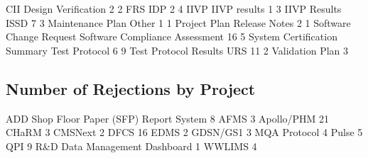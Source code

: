 \documentclass{article}
\begin{document}
\begin{Schunk}
\begin{Soutput}
                           CII            Design Verification 
                             2                              2 
                           FRS                            IDP 
                             2                              4 
                          IIVP                   IIVP results 
                             1                              3 
                  IIVP Results                           ISSD 
                             7                              3 
              Maintenance Plan                          Other 
                             1                              1 
                  Project Plan                  Release Notes 
                             2                              1 
       Software Change Request Software Compliance Assessment 
                            16                              5 
  System Certification Summary                  Test Protocol 
                             6                              9 
         Test Protocol Results                            URS 
                            11                              2 
               Validation Plan 
                             3 
\end{Soutput}
\end{Schunk}

\subsection{Number of Rejections by Project}

\begin{Schunk}
\begin{Soutput}
ADD Shop Floor Paper (SFP) Report System 
                                       8 
                                    AFMS 
                                       3 
                              Apollo/PHM 
                                      21 
                                   CHaRM 
                                       3 
                                 CMSNext 
                                       2 
                                    DFCS 
                                      16 
                                    EDMS 
                                       2 
                                GDSN/GS1 
                                       3 
                            MQA Protocol 
                                       4 
                                   Pulse 
                                       5 
                                     QPI 
                                       9 
           R&D Data Management Dashboard 
                                       1 
                                  WWLIMS 
                                       4 
\end{Soutput}
\end{Schunk}
\end{document}
